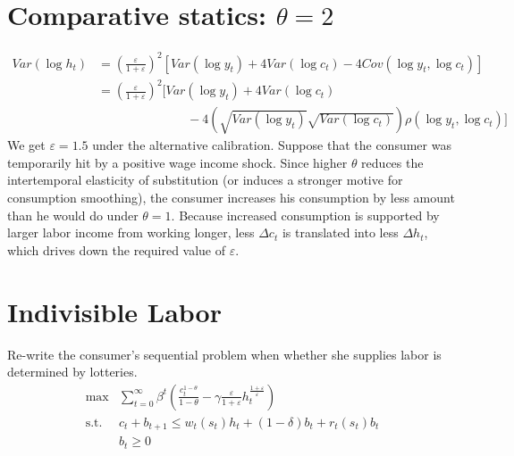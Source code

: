 \documentclass[12pt]{amsart}
\begin{document}
\section{Comparative statics: $\theta = 2$}
\begin{align*}
Var(\log h_t) & = \left( \frac{\varepsilon}{1+ \varepsilon}\right)^2 \left[ Var(\log y_t) +  4 Var(\log c_t) - 4 Cov(\log y_t, \log c_t) \right] \\
& = \left( \frac{\varepsilon}{1+ \varepsilon}\right)^2 \Bigg[ Var(\log y_t) + 4 Var(\log c_t) \\
& \hspace{3cm} - 4 \left( \sqrt{Var(\log y_t)} \sqrt{Var(\log c_t)} \right)\rho(\log y_t, \log c_t) \Bigg]
\end{align*}
We get $\varepsilon = 1.5$ under the alternative calibration. Suppose that the consumer was temporarily hit by a positive wage income shock. Since higher $\theta$ reduces the intertemporal elasticity of substitution (or induces a stronger motive for consumption smoothing), the consumer increases his consumption by less amount than he would do under $\theta=1$.  Because increased consumption is supported by larger labor income from working longer, less $\Delta c_t$ is translated into less $\Delta h_t$, which drives down the required value of $\varepsilon$. 
\section{Indivisible Labor}
Re-write the consumer's sequential problem when whether she supplies labor is determined by lotteries. 
\begin{align*}
\max &\sum_{t = 0}^{\infty} \beta^t \left( \frac{c_t^{1-\theta}}{1-\theta}  - \gamma \frac{\varepsilon}{1+\varepsilon} h_t^{\frac{1+\varepsilon}{\varepsilon}} \right) \\
\text{s.t. } & c_t + b_{t+1} \leq w_t(s_t) h_t + (1-\delta) b_{t} + r_t(s_t) b_{t} \\
& b_t \geq 0
\end{align*}
\end{document}
